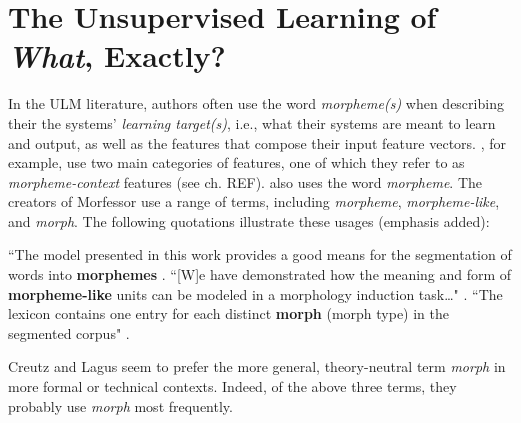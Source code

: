

\section{The Unsupervised Learning of \textit{What}, Exactly?} 
In the \ac{ULM} literature, authors often use the word \emph{morpheme(s)} 
when describing their the systems' \emph{learning target(s)}, i.e., what their systems are meant to learn and 
output, as well as the features that compose their input feature vectors.
\cite{poon-et-al:2009}, for example, use two main categories 
of features, one of which they refer to as \emph{morpheme-context} features (see ch. REF).
\cite{goldsmith:2001, goldsmith:2006} also uses the word 
\emph{morpheme}.
The creators of Morfessor 
\citep{creutz-and-lagus:2002, 
creutz-and-lagus:2005, creutz-and-lagus:2007}
use a range of terms, including 
\emph{morpheme},
\emph{morpheme-like}, and \emph{morph}. The following quotations 
illustrate these usages (emphasis added):
\begin{exe}
\ex ``The model presented in this 
work provides a good means for the segmentation of words into 
\textbf{morphemes} \citep[][p. 6]{creutz-and-lagus:2007}. 
\ex``[W]e have demonstrated how the meaning and form of 
\textbf{morpheme-like} units can be modeled in a 
morphology induction task\dots" \citep{creutz-and-lagus:2005}.
\ex``The lexicon contains one entry for each distinct \textbf{morph} 
(morph type) in the 
segmented corpus" \citep[][p. 9]{creutz-and-lagus:2007}. 
\end{exe}
Creutz and Lagus seem to prefer the more general, theory-neutral term \emph{morph} 
in more formal or technical contexts. Indeed,
of the above three terms, they probably use 
\emph{morph} most frequently.

